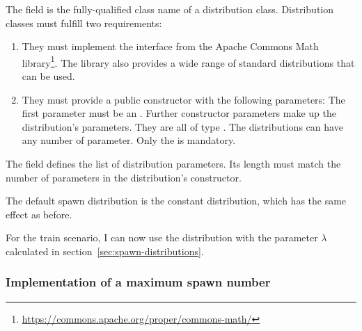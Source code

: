 The field  is the fully-qualified class name of
a distribution class.
Distribution classes must fulfill two requirements:

\begin{enumerate}

  \item They must implement the interface
    \href{https://commons.apache.org/proper/commons-math/javadocs/api-3.6.1/org/apache/commons/math3/distribution/RealDistribution.html}%
      {}
    from the Apache Commons Math
    library\footnote{\url{https://commons.apache.org/proper/commons-math/}}.
    The library also provides a wide range of standard distributions that can be
    used.

  \item They must provide a public constructor with the following parameters:
    The first parameter must be an
    \href{http://commons.apache.org/proper/commons-math/javadocs/api-3.6.1/org/apache/commons/math3/random/RandomGenerator.html}%
      {}.
    Further constructor parameters make up the distribution's parameters.
    They are all of type
    \href{https://docs.oracle.com/javase/7/docs/api/java/lang/Double.html}%
      {}.
    The distributions can have any number of parameter.
    Only the  is mandatory.

\end{enumerate}

The field  defines the list of distribution
parameters.
Its length must match the number of  parameters in the
distribution's constructor.

The default spawn distribution is the constant distribution, which has the same
effect as  before.

For the train scenario, I can now use the distribution
\href{https://commons.apache.org/proper/commons-math/javadocs/api-3.6.1/org/apache/commons/math3/distribution/ExponentialDistribution.html}%
  {}
with the parameter $λ$ calculated in section~\ref{sec:spawn-distributions}.

\subsubsection{Implementation of a maximum spawn number}

